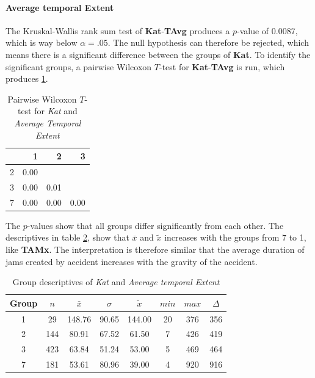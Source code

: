 \paragraph{Average temporal Extent}
The Kruskal-Wallis rank sum test of \textbf{Kat}-\textbf{TAvg} produces a $p$-value of 0.0087, which is way below $\alpha=.05$. The null hypothesis can therefore be rejected, which means there is a significant difference between the groups of \textbf{Kat}. To identify the significant groups, a pairwise Wilcoxon $T$-test for \textbf{Kat}-\textbf{TAvg} is run, which produces \cref{tbl:wilcoxon_baysis_initiator_Kat_TAvg}. 
\begin{table}[ht]
	\small
	\centering
    \begin{tabular}{rrrr}
        \toprule
        & 1 & 2 & 3 \\ 
        \midrule
        2 & 0.00 &  &  \\ 
        3 & 0.00 & 0.01 &  \\ 
        7 & 0.00 & 0.00 & 0.00 \\ 
        \bottomrule
    \end{tabular}
	\caption{Pairwise Wilcoxon $T$-test for \textit{Kat} and \textit{Average Temporal Extent}}
	\label{tbl:wilcoxon_baysis_initiator_Kat_TAvg}
\end{table}
The $p$-values show that all groups differ significantly from each other. The descriptives in table \cref{tbl:descriptives_baysis_initiator_Kat_TAvg}, show that $\bar{x}$ and $\tilde{x}$ increases with the groups from 7 to 1, like \textbf{TAMx}. The interpretation is therefore similar that the average duration of jams created by accident increases with the gravity of the accident.
\begin{table}[ht]
	\small
	\centering
    \begin{tabular}{c|c|c|c|c|c|c|c}
        \toprule
        Group & $n$ & $\bar{x}$ & $\sigma$ & $\tilde{x}$ & $min$ & $max$ & $\Delta$ \\
        \midrule
        1 & 29  & 148.76 & 90.65 & 144.00 & 20 & 376 & 356 \\ 
        2 & 144 & 80.91  & 67.52 & 61.50  & 7  & 426 & 419 \\ 
        3 & 423 & 63.84  & 51.24 & 53.00  & 5  & 469 & 464 \\ 
        7 & 181 & 53.61  & 80.96 & 39.00  & 4  & 920 & 916 \\ 
        \bottomrule
    \end{tabular}
	\caption{Group descriptives of \textit{Kat} and \textit{Average temporal Extent}}
	\label{tbl:descriptives_baysis_initiator_Kat_TAvg}
\end{table}

